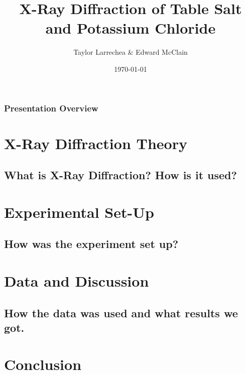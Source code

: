\documentclass{beamer}
\title[XRD of NaCl \& KCl]{X-Ray Diffraction of Table Salt and Potassium Chloride} %
\author{Taylor Larrechea \& Edward McClain} %
\institute[CMU] %
{
Colorado Mesa University \\ %
\medskip
\textit{tjlarrechea@mavs.coloradomesa.edu} %
}
\date{\today} %
\begin{document}
\begin{frame}
\titlepage %
\end{frame}

\begin{frame}
\frametitle{Presentation Overview} %
\tableofcontents %
\end{frame}


\section{X-Ray Diffraction Theory} 
\subsection{What is X-Ray Diffraction? How is it used?} 
\section{Experimental Set-Up}
\subsection{How was the experiment set up?}
\section{Data and Discussion}
\subsection{How the data was used and what results we got.}
\section{Conclusion}
\end{document}
